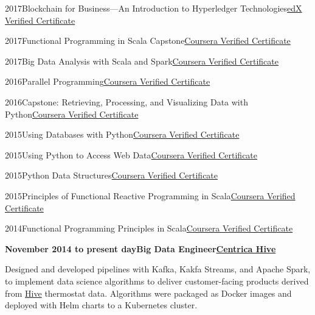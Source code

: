 \documentclass[a4paper,12pt]{article}
\newcommand{\head}[1]{\needspace{6em}\begin{center}{\large{\textbf{\sc{#1}}}}\nopagebreak\end{center}}
\newcommand{\clientwork}[3]{\textbf{#1\hfill#3\hfill#2}\nopagebreak}
\newcommand{\renewals}[1]{}
\newcommand{\tab}{\hspace{2em}}
\newcommand{\education}[3]{#1\tab#2\hfill#3}
\begin{document}
\head{Certifications}

\education{2017}{Blockchain for Business---An Introduction to Hyperledger Technologies}{\href{https://courses.edx.org/certificates/de3424d0c11842f48fb2c79ddf1073c8}{edX Verified Certificate}}

\education{2017}{Functional Programming in Scala Capstone}{\href{https://www.coursera.org/account/accomplishments/verify/4F5MVWUN8MWZ}{Coursera Verified Certificate}}

\education{2017}{Big Data Analysis with Scala and Spark}{\href{https://www.coursera.org/account/accomplishments/verify/BT95Z35S6LVX}{Coursera Verified Certificate}}

\education{2016}{Parallel Programming}{\href{https://www.coursera.org/account/accomplishments/verify/CJ4JSLUQK73D}{Coursera Verified Certificate}}

\education{2016}{Capstone: Retrieving, Processing, and Visualizing Data with Python}{\href{https://www.coursera.org/account/accomplishments/verify/8MKC3G5RN9S3}{Coursera Verified Certificate}}

\education{2015}{Using Databases with Python}{\href{https://www.coursera.org/account/accomplishments/verify/JNESYEJ5FURJ}{Coursera Verified Certificate}}

\education{2015}{Using Python to Access Web Data}{\href{https://www.coursera.org/account/accomplishments/verify/BVY6EDX4Z2PM}{Coursera Verified Certificate}}

\education{2015}{Python Data Structures}{\href{https://www.coursera.org/account/accomplishments/verify/VHVY2836QWWS}{Coursera Verified Certificate}}

\education{2015}{Principles of Functional Reactive Programming in Scala}{\href{https://www.coursera.org/account/accomplishments/records/8jPph3vAjsWdaQeW}{Coursera Verified Certificate}}

\education{2014}{Functional Programming Principles in Scala}{\href{https://www.coursera.org/maestro/api/certificate/get_certificate?verify-code=87DZAXY7SA}{Coursera Verified Certificate}}

\head{Career History}

\clientwork{November 2014 to present day}{\href{https://www.hivehome.com}{Centrica Hive}}{Big Data Engineer}

\renewals{5}

Designed and developed pipelines with Kafka, Kakfa Streams, and Apache Spark, to implement data science algorithms to deliver customer-facing products derived from \href{https://www.hivehome.com}{Hive} thermostat data. Algorithms were packaged as Docker images and deployed with Helm charts to a Kubernetes cluster.\\
\end{document}
